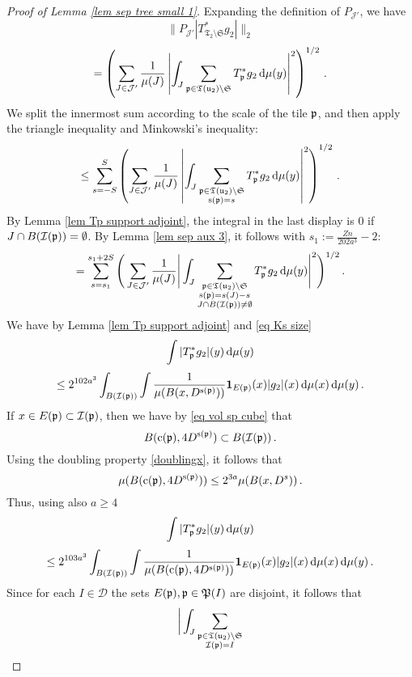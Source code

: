 {\begin{proof}[Proof of Lemma \ref{lem sep tree small 1}]
    Expanding the definition of $P_{\mathcal{J}'}$, we have
    $$
        \|P_{\mathcal{J}'}|T_{\mathfrak{T}_2 \setminus \mathfrak{S}}^* g_2|\|_2
    $$
    $$
        = \left(\sum_{J \in \mathcal{J}'} \frac{1}{\mu(J)} \left|\int_J \sum_{\mathfrak p \in \mathfrak T(\mathfrak u_2) \setminus \mathfrak{S}} T_{\mathfrak p}^* g_2 \, \mathrm{d}\mu(y) \right|^2 \right)^{1/2}\,.
    $$
    We split the innermost sum according to the scale of the tile $\mathfrak p$, and then apply the triangle inequality and Minkowski's inequality:
    $$
        \le \sum_{s = -S}^S \left( \sum_{J \in \mathcal{J}'} \frac{1}{\mu(J)} \left|\int_J \sum_{\substack{\mathfrak p \in \mathfrak T(\mathfrak u_2) \setminus \mathfrak{S}\\ \mathrm{s}(\mathfrak p) = s}} T_{\mathfrak p}^* g_2 \, \mathrm{d}\mu(y) \right|^2\right)^{1/2}\,.
    $$
    By Lemma \ref{lem Tp support adjoint}, the integral in the last display is $0$ if $J \cap B(\mathcal{I}(\mathfrak p)) = \emptyset$. By Lemma \ref{lem sep aux 3}, it follows with $s_1 := \frac{Zn}{202a^3} - 2$:
    \begin{equation}
    \label{eq sep tree small 1}
        = \sum_{s = s_1}^{s_1 + 2S} \Bigg( \sum_{J \in \mathcal{J}'} \frac{1}{\mu(J)} \Bigg|\int_J \sum_{\substack{\mathfrak p \in \mathfrak T(\mathfrak u_2) \setminus \mathfrak{S}\\ \mathrm{s}(\mathfrak p) = s(J) - s\\
        J \cap B(\mathcal{I}(\mathfrak p)) \ne \emptyset}} T_{\mathfrak p}^* g_2 \, \mathrm{d}\mu(y) \Bigg|^2\Bigg)^{1/2}\,.
    \end{equation}
    We have by Lemma \ref{lem Tp support adjoint} and \eqref{eq Ks size}
    $$
        \int |T_{\mathfrak p}^* g_2|(y) \, \mathrm{d}\mu(y)
    $$
    $$
        \le 2^{102a^3} \int_{B(\mathcal{I}(\mathfrak p))} \int \frac{1}{\mu(B(x, D^{\mathrm{s}(\mathfrak p)}))} \mathbf{1}_{E(\mathfrak p)}(x) |g_2|(x) \, \mathrm{d}\mu(x) \, \mathrm{d}\mu(y)\,.
    $$
    If $x \in E(\mathfrak p) \subset \mathcal{I}(\mathfrak p)$, then we have by \eqref{eq vol sp cube} that
    $$
        B(\mathrm{c}(\mathfrak p), 4D^{\mathrm{s}(\mathfrak p)}) \subset B(\mathcal{I}(\mathfrak p))\,.
    $$
    Using the doubling property \eqref{doublingx}, it follows that
    $$
        \mu(B(\mathrm{c}(\mathfrak p), 4D^{\mathrm{s}(\mathfrak p)})) \le 2^{3a} \mu(B(x, D^s))\,.
    $$
    Thus, using also $a \ge 4$
    $$
        \int |T_{\mathfrak p}^* g_2|(y) \, \mathrm{d}\mu(y)
    $$
    $$
        \le 2^{103 a^3} \int_{B(\mathcal{I}(\mathfrak p))} \int \frac{1}{\mu(B(\mathrm{c}(\mathfrak p), 4D^{\mathrm{s}(\mathfrak p)}))} \mathbf{1}_{E(\mathfrak p)}(x) |g_2|(x) \, \mathrm{d}\mu(x) \, \mathrm{d}\mu(y)\,.
    $$
    Since for each $I \in \mathcal{D}$ the sets $E(\mathfrak p), \mathfrak p \in \mathfrak P(I)$ are disjoint, it follows that
    $$
        \bigg| \int_J \sum_{\substack{\mathfrak p \in \mathfrak T(\mathfrak u_2) \setminus \mathfrak{S}\\ \mathcal{I}(\mathfrak p) = I\\
}}$$
\end{proof}}
